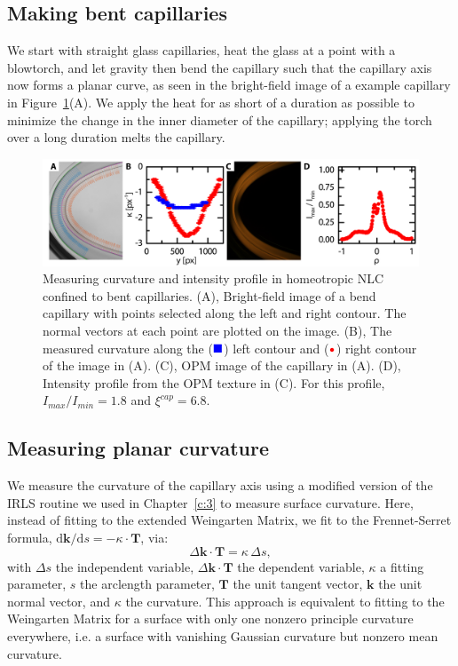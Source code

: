 \subsection{Making bent capillaries}
We start with straight glass capillaries, heat the glass at a point with a blowtorch, and let gravity then bend the capillary such that the capillary axis now forms a planar curve, as seen in the bright-field image of a example capillary in Figure~\ref{f:4-BentCaps}(A).
We apply the heat for as short of a duration as possible to minimize the change in the inner diameter of the capillary; applying the torch over a long duration melts the capillary.
\begin{figure}
  \centering
  \includegraphics{figures/C4/Ch4-Figs_BentCaps.png}
  \caption{Measuring curvature and intensity profile in homeotropic NLC confined to bent capillaries.
  (A), Bright-field image of a bend capillary with points selected along the left and right contour.
  The normal vectors at each point are plotted on the image.
  (B), The measured curvature along the (${\color{blue} \blacksquare}$) left contour and (${\color{red} \bullet}$) right contour of the image in (A).
  (C), OPM image of the capillary in (A).
  (D), Intensity profile from the OPM texture in (C).
  For this profile, $I_{max}/I_{min} = 1.8$ and $\xi^{cap} = 6.8$.}\label{f:4-BentCaps}
\end{figure}

\subsection{Measuring planar curvature}
We measure the curvature of the capillary axis using a modified version of the IRLS routine we used in Chapter~\ref{c:3} to measure surface curvature.
Here, instead of fitting to the extended Weingarten Matrix, we fit to the Frennet-Serret formula, $\textrm{d}\mathbf{k}/\textrm{d}s = -\kappa \cdot \mathbf{T}$, via:
\begin{equation}
  \Delta \mathbf{k} \cdot \mathbf{T} = \kappa \, \Delta s,\label{e:4-FSfit}
\end{equation}
with $\Delta s$ the independent variable, $\Delta \mathbf{k} \cdot \mathbf{T}$ the dependent variable, $\kappa$ a fitting parameter, $s$ the arclength parameter, $\mathbf{T}$ the unit tangent vector, $\mathbf{k}$ the unit normal vector, and $\kappa$ the curvature.
This approach is equivalent to fitting to the Weingarten Matrix for a surface with only one nonzero principle curvature everywhere, i.e. a surface with vanishing Gaussian curvature but nonzero mean curvature.

